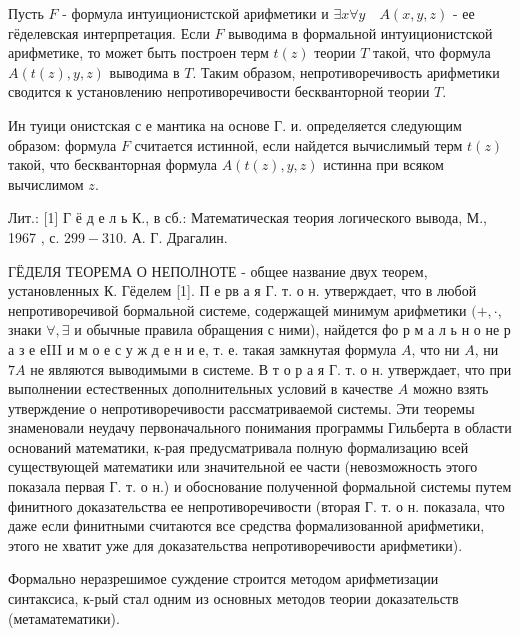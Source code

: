 \documentclass[10pt]{article}
\begin{document}
Пусть $F$ - формула интуиционистской арифметики и $\exists x \forall y \quad A(x, y, z)$ - ее гёделевская интерпретация. Если $F$ выводима в формальной интуиционистской арифметике, то может быть построен терм $t(z)$ теории $T$ такой, что формула $A(t(z), y, z)$ выводима в $T$. Таким образом, непротиворечивость арифметики сводится к установлению непротиворечивости бескванторной теории $T$.



Ин туици онистская с е мантика на основе Г. и. определяется следующим образом: формула $F$ считается истинной, если найдется вычислимый терм $t(z)$ такой, что бескванторная формула $A(t(z), y, z)$ истинна при всяком вычислимом $z$.



Лит.: [1] Г ё д е л ь К., в сб.: Математическая теория логического вывода, М., 1967 , с. $299-310$. А. Г. Драгалин.



ГЁДЕЛЯ ТЕОРЕМА О НЕПОЛНОТЕ - общее название двух теорем, установленных К. Гёделем [1]. П е рв а я Г. т. о н. утверждает, что в любой непротиворечивой бормальной системе, содержащей минимум арифметики $(+, \cdot$, знаки $\forall, \exists$ и обычные правила обращения с ними), найдется фо р м а л ь н о не р а з е еIII и м о е с у ж д е н и е, т. е. такая замкнутая формула $A$, что ни $A$, ни $7 A$ не являются выводимыми в системе. В т о р а я Г. т. о н. утверждает, что при выполнении естественных дополнительных условий в качестве $A$ можно взять утверждение о непротиворечивости рассматриваемой системы. Эти теоремы знаменовали неудачу первоначального понимания программы Гильберта в области оснований математики, к-рая предусматривала полную формализацию всей существующей математики или значительной ее части (невозможность этого показала первая Г. т. о н.) и обоснование полученной формальной системы путем финитного доказательства ее непротиворечивости (вторая Г. т. о н. показала, что даже если финитными считаются все средства формализованной арифметики, этого не хватит уже для доказательства непротиворечивости арифметики).



Формально неразрешимое суждение строится методом арифметизации синтаксиса, к-рый стал одним из основных методов теории доказательств (метаматематики).
\end{document}
